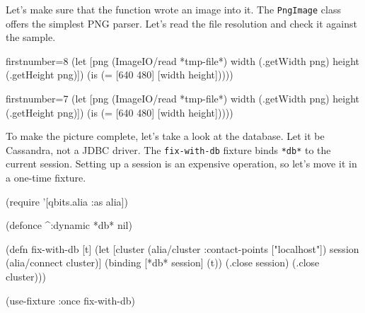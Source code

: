 \fi

\wavebottom

\noindent
Let's make sure that the function wrote an image into it. The \verb|PngImage| class offers the simplest PNG parser. Let's read the file resolution and check it against the sample.

\wavetop

\ifx\DEVICETYPE\MOBILE

\begin{english}
  \begin{clojure/lines*}{firstnumber=8}
(let [png (ImageIO/read *tmp-file*)
      width (.getWidth png)
      height (.getHeight png)])
(is (= [640 480] [width height]))))
  \end{clojure/lines*}
\end{english}

\else

\begin{english}
  \begin{clojure/lines*}{firstnumber=7}
    (let [png (ImageIO/read *tmp-file*)
          width (.getWidth png)
          height (.getHeight png)])
    (is (= [640 480] [width height]))))
  \end{clojure/lines*}
\end{english}
\fi



To make the picture complete, let's take a look at the database. Let it be Cassandra, not a JDBC driver. The \verb|fix-with-db| fixture binds \verb|*db*| to the current session. Setting up a session is an expensive operation, so let's move it in a one-time fixture.

\ifx\DEVICETYPE\MOBILE

\begin{english}
  \begin{clojure}
(require '[qbits.alia :as alia])

(defonce ^:dynamic *db* nil)

(defn fix-with-db [t]
  (let [cluster (alia/cluster
                  {:contact-points
                   ["localhost"]})
        session (alia/connect cluster)]
    (binding [*db* session]
      (t))
    (.close session)
    (.close cluster)))

(use-fixture :once fix-with-db)
  \end{clojure}
\end{english}

\else

